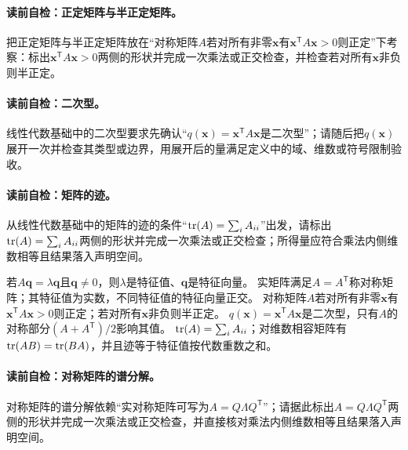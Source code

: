 \paragraph{读前自检：正定矩阵与半正定矩阵。}把正定矩阵与半正定矩阵放在“对称矩阵$A$若对所有非零$\boldsymbol{x}$有$\boldsymbol{x}^{\mathsf T}A\boldsymbol{x}>0$则正定”下考察：标出$\boldsymbol{x}^{\mathsf T}A\boldsymbol{x}>0$两侧的形状并完成一次乘法或正交检查，并检查若对所有$\boldsymbol{x}$非负则半正定。\par
\paragraph{读前自检：二次型。}线性代数基础中的二次型要求先确认“$q(\boldsymbol{x})=\boldsymbol{x}^{\mathsf T}A\boldsymbol{x}$是二次型”；请随后把$q(\boldsymbol{x})$展开一次并检查其类型或边界，用展开后的量满足定义中的域、维数或符号限制验收。\par
\paragraph{读前自检：矩阵的迹。}从线性代数基础中的矩阵的迹的条件“$\operatorname{tr}(A)=\sum_iA_{ii}$”出发，请标出$\operatorname{tr}(A)=\sum_iA_{ii}$两侧的形状并完成一次乘法或正交检查；所得量应符合乘法内侧维数相等且结果落入声明空间。\par

若$A\boldsymbol{q}=\lambda\boldsymbol{q}$且$\boldsymbol{q}\ne0$，则$\lambda$是特征值、$\boldsymbol{q}$是特征向量。
实矩阵满足$A=A^{\mathsf T}$称对称矩阵；其特征值为实数，不同特征值的特征向量正交。
对称矩阵$A$若对所有非零$\boldsymbol{x}$有$\boldsymbol{x}^{\mathsf T}A\boldsymbol{x}>0$则正定；若对所有$\boldsymbol{x}$非负则半正定。
$q(\boldsymbol{x})=\boldsymbol{x}^{\mathsf T}A\boldsymbol{x}$是二次型，只有$A$的对称部分$(A+A^{\mathsf T})/2$影响其值。
$\operatorname{tr}(A)=\sum_iA_{ii}$；对维数相容矩阵有$\operatorname{tr}(AB)=\operatorname{tr}(BA)$，并且迹等于特征值按代数重数之和。


\paragraph{读前自检：对称矩阵的谱分解。}对称矩阵的谱分解依赖“实对称矩阵可写为$A=Q\Lambda Q^{\mathsf T}$”；请据此标出$A=Q\Lambda Q^{\mathsf T}$两侧的形状并完成一次乘法或正交检查，并直接核对乘法内侧维数相等且结果落入声明空间。\par
